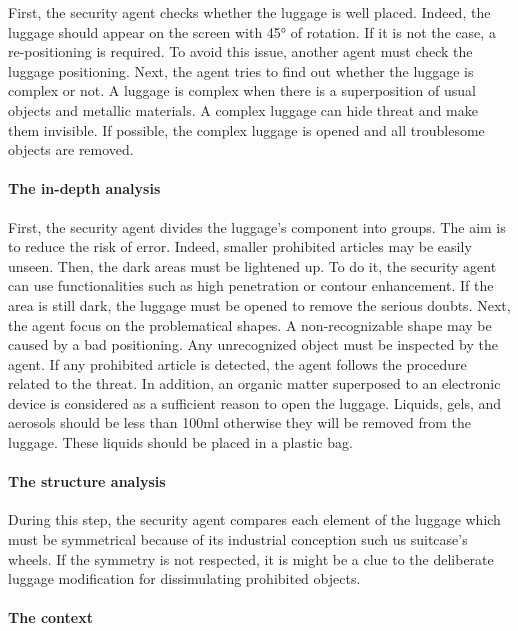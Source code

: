 First, the security agent checks whether the luggage is well placed. Indeed, the luggage should appear on the screen with \ang{45} of rotation. If it is not the case, a re-positioning is required. To avoid this issue, another agent must check the luggage positioning.
Next, the agent tries to find out whether the luggage is complex or not. A luggage is complex when there is a superposition of usual objects and metallic materials. A complex luggage can hide threat and make them invisible. If possible, the complex luggage is opened and all troublesome objects are removed.

\paragraph{The in-depth analysis}


First, the security agent divides the luggage's component into groups. The aim is to reduce the risk of error. Indeed, smaller prohibited articles may be easily unseen. Then, the dark areas must be lightened up. To do it, the security agent can use functionalities such as high penetration or contour enhancement. If the area is still dark, the luggage must be opened to remove the serious doubts.
Next, the agent focus on the problematical shapes. A non-recognizable shape may be caused by a bad positioning. Any unrecognized object must be inspected by the agent. If any prohibited article is detected, the agent follows the procedure related to the threat. In addition, an organic matter superposed to an electronic device is considered as a sufficient reason to open the luggage. Liquids, gels, and aerosols should be less than 100ml otherwise they will be removed from the luggage. These liquids should be placed in a plastic bag.

\paragraph{The structure analysis}


During this step, the security agent compares each element of the luggage which must be symmetrical because of its industrial conception such us suitcase's wheels. If the symmetry is not respected, it is might be a clue to the deliberate luggage modification for dissimulating prohibited objects.

\paragraph{The context}


